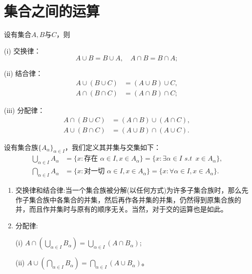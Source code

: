 \documentclass[../../main.tex]{subfiles}
\begin{document}
\section{集合之间的运算}

\begin{theorem}\label{theorem:集合运算的基本性质}
设有集合\(A,B\)与\(C\)，则

(i) 交换律：
\[A\cup B = B\cup A, \quad A\cap B = B\cap A;\]

(ii) 结合律：
\begin{align*}
  A\cup(B\cup C)&=(A\cup B)\cup C,\\
A\cap(B\cap C)&=(A\cap B)\cap C;
\end{align*}

(iii) 分配律：
\begin{align*}
A\cap(B\cup C)&=(A\cap B)\cup(A\cap C),\\
A\cup(B\cap C)&=(A\cup B)\cap(A\cup C).
\end{align*}
\end{theorem}

\begin{definition}[集族的并和交]\label{definition:集族的并和交}
设有集合族\(\{A_{\alpha}\}_{\alpha\in I}\)，我们定义其并集与交集如下：
\begin{align*}
\bigcup_{\alpha\in I}A_{\alpha}&=\{x:\text{存在 }\alpha\in I,x\in A_{\alpha}\}=\{x:\exists \alpha \in I\,\,s.t\,\,\,x\in A_{\alpha}\},\\
\bigcap_{\alpha\in I}A_{\alpha}&=\{x:\text{对一切 }\alpha\in I,x\in A_{\alpha}\}=\{x:\forall \alpha \in I,x\in A_{\alpha}\}.
\end{align*}
\end{definition}

\begin{theorem}\label{theorem:集族的并和交的基本性质}
\begin{enumerate}
  \item 交换律和结合律:当一个集合族被分解(以任何方式)为许多子集合族时，那么先作子集合族中各集合的并集，然后再作各并集的并集，仍然得到原集合族的并，而且作并集时与原有的顺序无关。当然，对于交的运算也是如此。

  \item 分配律:

  (i) \(A\cap\left(\bigcup_{\alpha\in I}B_{\alpha}\right)=\bigcup_{\alpha\in I}(A\cap B_{\alpha})\);

(ii) \(A\cup\left(\bigcap_{\alpha\in I}B_{\alpha}\right)=\bigcap_{\alpha\in I}(A\cup B_{\alpha})\)。
\end{enumerate}
\end{theorem}
\end{document}
